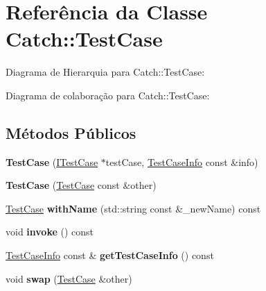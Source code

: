 \hypertarget{classCatch_1_1TestCase}{}\section{Referência da Classe Catch\+:\+:Test\+Case}
\label{classCatch_1_1TestCase}


Diagrama de Hierarquia para Catch\+:\+:Test\+Case\+:


Diagrama de colaboração para Catch\+:\+:Test\+Case\+:
\subsection*{Métodos Públicos}
\begin{DoxyCompactItemize}
\item 
{\bfseries Test\+Case} (\hyperlink{structCatch_1_1ITestCase}{I\+Test\+Case} $\ast$test\+Case, \hyperlink{structCatch_1_1TestCaseInfo}{Test\+Case\+Info} const \&info)\hypertarget{classCatch_1_1TestCase_a03a5b913484681bd6d398dc5e9c2a907}{}\label{classCatch_1_1TestCase_a03a5b913484681bd6d398dc5e9c2a907}

\item 
{\bfseries Test\+Case} (\hyperlink{classCatch_1_1TestCase}{Test\+Case} const \&other)\hypertarget{classCatch_1_1TestCase_ac0011d3789edc3e44edb41f13c4775a0}{}\label{classCatch_1_1TestCase_ac0011d3789edc3e44edb41f13c4775a0}

\item 
\hyperlink{classCatch_1_1TestCase}{Test\+Case} {\bfseries with\+Name} (std\+::string const \&\+\_\+new\+Name) const \hypertarget{classCatch_1_1TestCase_ab6dbc6c82b7c1680013c67bdedccfc8e}{}\label{classCatch_1_1TestCase_ab6dbc6c82b7c1680013c67bdedccfc8e}

\item 
void {\bfseries invoke} () const \hypertarget{classCatch_1_1TestCase_aac2e028135cc88c3e3aac04650960a6c}{}\label{classCatch_1_1TestCase_aac2e028135cc88c3e3aac04650960a6c}

\item 
\hyperlink{structCatch_1_1TestCaseInfo}{Test\+Case\+Info} const \& {\bfseries get\+Test\+Case\+Info} () const \hypertarget{classCatch_1_1TestCase_a25c03661ab092431cdff10df5c58a5a7}{}\label{classCatch_1_1TestCase_a25c03661ab092431cdff10df5c58a5a7}

\item 
void {\bfseries swap} (\hyperlink{classCatch_1_1TestCase}{Test\+Case} \&other)\hypertarget{classCatch_1_1TestCase_aee38f908faf10b905b209ca388275413}{}\label{classCatch_1_1TestCase_aee38f908faf10b905b209ca388275413}


\end{DoxyCompactItemize}
